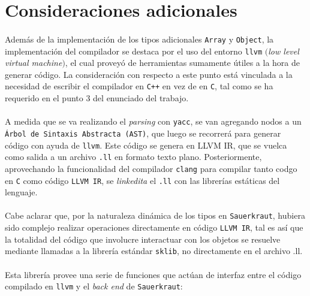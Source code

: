 \documentclass[12pt]{article}
\begin{document}
	\section{Consideraciones adicionales}
	
	\paragraph{} Además de la implementación de los tipos adicionales \verb|Array| y \verb|Object|, la implementación del compilador se destaca por el uso del entorno \verb|llvm| $($\textit{low level virtual machine}$)$, el cual proveyó de herramientas sumamente útiles a la hora de generar código. La consideración con respecto a este punto está vinculada a la necesidad de escribir el compilador en \verb|C++| en vez de en \verb|C|, tal como se ha requerido en el punto 3 del enunciado del trabajo.
	
	\paragraph{} A medida que se va realizando el \textit{parsing} con \verb|yacc|, se van agregando nodos a un \verb|Árbol de Sintaxis Abstracta (AST)|, que luego se recorrerá para generar código con ayuda de \verb|llvm|. Este código se genera en LLVM IR, que se vuelca como salida a un archivo \verb|.ll| en formato texto plano. Posteriormente, aprovechando la funcionalidad del compilador \verb|clang| para compilar tanto codgo en \verb|C| como código \verb|LLVM IR|, se \textit{linkedita} el \verb|.ll| con las librerías estáticas del lenguaje.
	
	\paragraph{} Cabe aclarar que, por la naturaleza dinámica de los tipos en \verb|Sauerkraut|, hubiera sido complejo realizar operaciones directamente en código \verb|LLVM IR|, tal es así que la totalidad del código que involucre interactuar con los objetos se resuelve mediante llamadas a la librería estándar \verb|sklib|, no directamente en el archivo .ll. 
	
	\paragraph{} Esta librería provee una serie de funciones que actúan de interfaz entre el código compilado en \verb|llvm| y el \textit{back end} de \verb|Sauerkraut|:
	
\end{document}
